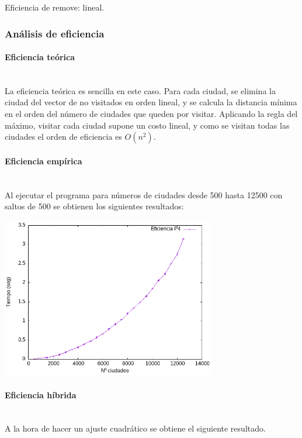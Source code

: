 \documentclass{article}
\newcommand{\myparagraph}[1]{\paragraph{#1}\mbox{}\\}
\begin{document}


Eficiencia de remove: lineal.

\subsubsection{Análisis de eficiencia}
\myparagraph{Eficiencia teórica}

La eficiencia teórica es sencilla en este caso. Para cada ciudad, se elimina la ciudad del vector de no visitados en orden lineal, y se calcula la distancia mínima en el orden del número de ciudades que queden por visitar. Aplicando la regla del máximo, visitar cada ciudad supone un costo lineal, y como se visitan todas las ciudades el orden de eficiencia es $O(n^2)$.

\myparagraph{Eficiencia empírica}

Al ejecutar el programa para números de ciudades desde 500 hasta 12500 con saltos de 500 se obtienen los siguientes resultados:

\begin{center}
    \includegraphics[width=0.7\textwidth]{Problema4/imagenes/timesP4.png}   
\end{center}

\myparagraph{Eficiencia híbrida}

A la hora de hacer un ajuste cuadrático se obtiene el siguiente resultado.
\end{document}
